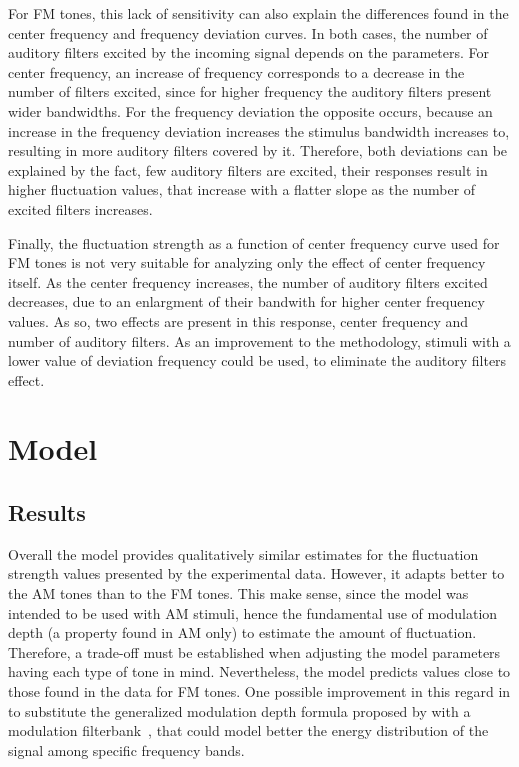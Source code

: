 \documentclass[../main.tex]{subfiles}
\begin{document}
For \gls{FM} tones, this lack of sensitivity can also explain the differences
found in the center frequency and frequency deviation curves. In both cases,
the number of auditory filters excited by the incoming signal depends on
the parameters. For center frequency, an increase of frequency corresponds to a
decrease in the number of filters excited, since for higher frequency the
auditory filters present wider bandwidths. For the frequency deviation the
opposite occurs, because an increase in the frequency deviation increases the
stimulus bandwidth increases to, resulting in more auditory filters covered
by it. Therefore, both deviations can be explained by the fact, few auditory
filters are excited, their responses result in higher fluctuation values, that
increase with a flatter slope as the number of excited filters increases.

Finally, the fluctuation strength as a function of center frequency curve used
for \gls{FM} tones is not very suitable for analyzing only the effect of center
frequency itself. As the center frequency increases, the number of auditory
filters excited decreases, due to an enlargment of their bandwith for higher
center frequency values. As so, two effects are present in this response, center
frequency and number of auditory filters. As an improvement to the methodology,
stimuli with a lower value of deviation frequency could be used, to eliminate
the auditory filters effect.

\section{Model}

\subsection{Results}

Overall the model provides qualitatively similar estimates for the fluctuation
strength values presented by the experimental data. However, it adapts better to
the \gls{AM} tones than to the \gls{FM} tones. This make sense, since the model
was intended to be used with \gls{AM} stimuli, hence the fundamental use of
modulation depth (a property found in \gls{AM} only) to estimate the amount of
fluctuation. Therefore, a trade-off must be established when adjusting the model
parameters having each type of tone in mind. Nevertheless, the model predicts
values close to those found in the data for \gls{FM} tones. One possible
improvement in this regard in to substitute the generalized modulation depth
formula proposed by \citeauthor{daniel1997psychoacoustical} with a modulation
filterbank~\cite{Dau1997}, that could model better the energy distribution of
the signal among specific frequency bands.
\end{document}
